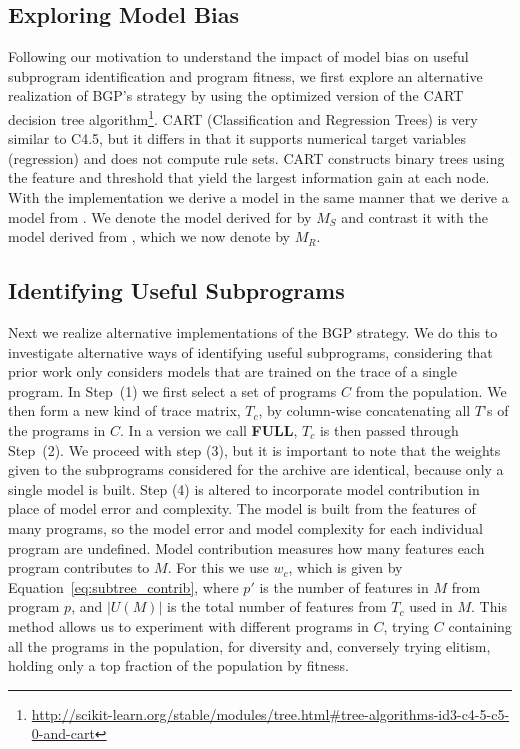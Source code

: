 \subsection{Exploring Model Bias}
Following our motivation to understand the impact of model bias on useful subprogram identification and program fitness, we first explore an alternative realization of BGP's strategy by using the \SCIKIT optimized version of the CART decision tree algorithm\footnote{\url{http://scikit-learn.org/stable/modules/tree.html\#tree-algorithms-id3-c4-5-c5-0-and-cart}}.  CART (Classification and Regression Trees) is very similar to C4.5, but it differs in that it supports numerical target variables (regression) and does not compute rule sets. CART constructs binary trees using the feature and threshold that yield the largest information gain at each node.  With the \SCIKIT implementation we derive a model in the same manner that we derive a model from \REPTREE.  We denote the model derived for \SCIKIT by $M_S$ and contrast it with the model derived from \REPTREE, which we now denote by $M_R$.

\subsection{Identifying Useful Subprograms}
\label{section:identifying_useful_subprograms}
\newcommand{\FULL}{\textbf{FULL}\xspace}
\newcommand{\DRAW}{\textbf{DRAW}\xspace}
Next we realize alternative implementations of the BGP strategy. We do this to investigate alternative ways of identifying useful subprograms, considering that prior work only considers models that are trained on the trace of a single program. In Step~(1) we first select a set of programs  $C$ from the population. We then form a new kind of trace matrix, $T_c$, by column-wise concatenating all $T${'s} of the programs in $C$. In a version we call \FULL,  $T_c$ is then passed through Step~(2). We proceed with step (3), but it is important to note that the weights given to the subprograms considered for the archive are identical, because only a single model is built. Step (4) is altered to incorporate model contribution in place of model error and complexity. The model is built from the features of many programs, so the model error and model complexity for each individual program are undefined. Model contribution measures how many features each program contributes to $M$.  For this we use $w_{c}$, which is given by Equation~\ref{eq:subtree_contrib}, where $p'$ is the number of features in $M$ from program $p$, and $|U(M)|$ is the total number of features from $T_{c}$ used in $M$. This method allows us to experiment with different programs in $C$, trying $C$ containing all the programs in the population, for diversity and, conversely trying elitism, holding only a top fraction of the  population by fitness. 

